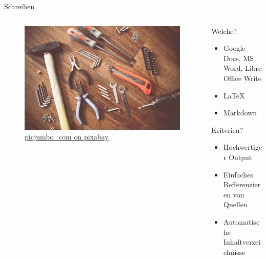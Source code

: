 \begin{frame}[t]{Schreiben}
    \begin{columns}[t]
        \begin{column}{0.29\textwidth}      
            \vspace{-3em} 
            \begin{figure}[t]
                \begin{flushleft}
                    \includegraphics[height=0.8\textheight,trim={0 0 25cm 0},clip]{graphics/tools-864983_1280.jpg}         
                    \caption*{\href{https://pixabay.com/de/photos/werkzeuge-konstruieren-boot-864983/}{picjumbo\_com on pixabay}}    
                \end{flushleft}                
                      
            \end{figure}
        \end{column}        
        \begin{column}{0.7\textwidth}
            Welche?
            \begin{itemize}[]
                \item Google Docs, MS Word, Libre Office Write
                \item \LaTeX
                \item Markdown
            \end{itemize}
            Kriterien?
            \begin{itemize}[]
                \item Hochwertiger Output
                \item Einfaches Refferenzieren von Quellen
                \item Automatische Inhaltverzeichnisse
            \end{itemize}
        \end{column}
    \end{columns}
\end{frame}

